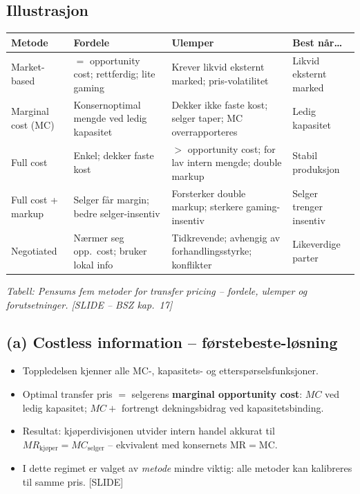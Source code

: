 \subsection*{Illustrasjon}

\begin{center}
\renewcommand{\arraystretch}{1.18}
\begin{tabular}{@{}p{3.0cm}p{4.6cm}p{4.8cm}p{2.2cm}@{}}
\toprule
\textbf{Metode} & \textbf{Fordele} & \textbf{Ulemper} & \textbf{Best n\aa r\dots} \\
\midrule
Market-based & $=$ opportunity cost; rettferdig; lite gaming & Krever likvid eksternt marked; pris-volatilitet & Likvid eksternt marked \\
Marginal cost (MC) & Konsernoptimal mengde ved ledig kapasitet & Dekker ikke faste kost; selger taper; MC overrapporteres & Ledig kapasitet \\
Full cost & Enkel; dekker faste kost & $>$ opportunity cost; for lav intern mengde; double markup & Stabil produksjon \\
Full cost + markup & Selger f\aa r margin; bedre selger-insentiv & Forsterker double markup; sterkere gaming-insentiv & Selger trenger insentiv \\
Negotiated & N\ae rmer seg opp.\ cost; bruker lokal info & Tidkrevende; avhengig av forhandlingsstyrke; konflikter & Likeverdige parter \\
\bottomrule
\end{tabular}
\end{center}
\textit{Tabell: Pensums fem metoder for transfer pricing -- fordele, ulemper og forutsetninger. [SLIDE -- BSZ kap.\ 17]}


\subsection*{(a) Costless information -- førstebeste-løsning}
\begin{itemize}\setlength{\itemsep}{2pt}
\item Toppledelsen kjenner alle MC-, kapasitets- og etterspørselsfunksjoner.
\item Optimal transfer pris $=$ selgerens \textbf{marginal opportunity cost}: $MC$ ved ledig kapasitet; $MC + $ fortrengt dekningsbidrag ved kapasitetsbinding.
\item Resultat: kjøperdivisjonen utvider intern handel akkurat til $MR_{\text{kj\o per}} = MC_{\text{selger}}$ -- ekvivalent med konsernets MR$=$MC.
\item I dette regimet er valget av \emph{metode} mindre viktig: alle metoder kan kalibreres til samme pris. [SLIDE]
\end{itemize}

